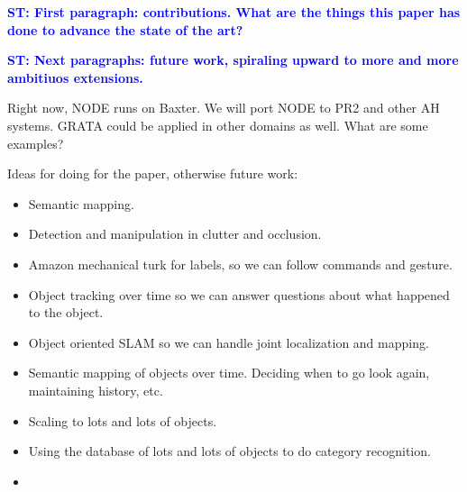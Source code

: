 \documentclass[conference]{IEEEtran}
\newcommand{\stnote}[1]{\textcolor{blue}{\textbf{ST: #1}}}
\begin{document}
\stnote{First paragraph:  contributions.  What are the things this paper has done to advance the state of the art?}

\stnote{Next paragraphs: future work, spiraling upward to more and
  more ambitiuos extensions.}

Right now, NODE runs on Baxter. We will port NODE to PR2 and other AH systems.
GRATA could be applied in other domains as well.  What are some examples?

Ideas for doing for the paper, otherwise future work: 
\begin{itemize}
\item Semantic mapping. 
\item Detection and manipulation in clutter and occlusion.
\item Amazon mechanical turk for labels, so we can follow commands and gesture.
\item Object tracking over time so we can answer questions about what
  happened to the object.
\item Object oriented SLAM so we can handle joint localization and mapping.
\item Semantic mapping of objects over time.  Deciding when to go look
  again, maintaining history, etc. 
\item Scaling to lots and lots of objects.
\item Using the database of lots and lots of objects to do category recognition.
\item 
\end{itemize}

%



\end{document}
